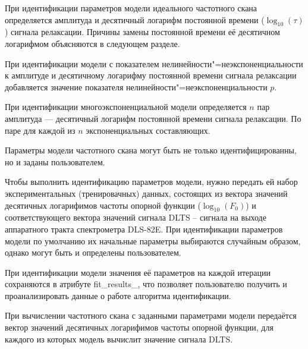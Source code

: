 	При идентификации параметров модели идеального частотного скана 
	определяется амплитуда и десятичный логарифм постоянной времени 
	($\log_{10}(\tau)$) сигнала релаксации. Причины замены постоянной времени
	её десятичном логарифмом объясняются в следующем разделе.

	При идентификации модели с показателем нелинейности"=неэкспоненциальности
	к амплитуде и десятичному логарифму постоянной времени сигнала релаксации
	добавляется значение показателя нелинейности"=неэкспоненциальности $p$.

	При идентификации многоэкспоненциальной модели определяется $n$ пар 
	амплитуда --- десятичный логарифм постоянной времени сигнала релаксации. 
	По паре для каждой из $n$ экспоненциальных составляющих.

	Параметры модели частотного скана могут быть не только идентифицированны,
	но и заданы пользователем.

	Чтобы выполнить идентификацию параметров модели, нужно передать ей 
	набор экспериментальных (тренировачных) данных, состоящих из вектора 
	значений десятичных логарифимов частоты опорной функции ($\log_{10}(F_0)$)
	и соответствующего вектора значений сигнала DLTS -- сигнала на выходе 
	аппаратного тракта спектрометра DLS-82E. При идентификации параметров модели
	по умолчанию их начальные параметры выбираются случайным образом, однако
	могут быть и определены пользователем.

	При идентификации модели значения её параметров на каждой итерации 
	сохраняются в атрибуте fit\_results\_, что позволяет пользователю
	получить и проанализировать данные о работе алгоритма идентификации.

	При вычислении частотного скана с заданными параметрами модели передаётся
	вектор значений десятичных логарифимов частоты опорной функции, для каждого 
	из которых модель вычислит значение сигнала	DLTS.


